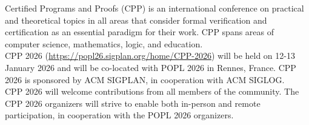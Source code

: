 \documentclass[prodmode,acmtecs]{acmsmall} %
\begin{document}
  Certified Programs and Proofs (CPP) is an international conference on practical and theoretical topics in all areas that consider formal verification and certification as an essential paradigm for their work. CPP spans areas of computer science, mathematics, logic, and education.\\ 
  CPP 2026 (\href{https://popl26.sigplan.org/home/CPP-2026}{https://popl26.sigplan.org/home/CPP-2026}) will be held on 12-13 January 2026 and will be co-located with POPL 2026 in Rennes, France. CPP 2026 is sponsored by ACM SIGPLAN, in cooperation with ACM SIGLOG.\\ 
  CPP 2026 will welcome contributions from all members of the community. The CPP 2026 organizers will strive to enable both in-person and remote participation, in cooperation with the POPL 2026 organizers.\\ 
\end{document}
